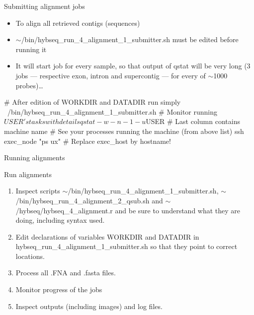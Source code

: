 \documentclass[compress, ucs, xelatex, 11pt, xcolor=x11names, aspectratio=1609,
	hyperref={
		bookmarks=true,
		unicode=true,
		colorlinks=true,
		pdftitle={HybSeq course},
		plainpages=false,
		pdfauthor={Vojtech Zeisek},
		pdfsubject={Practical processing of HybSeq target enrichment sequencing data on computing grids like MetaCentrum},
		pdfcreator={XeLaTeX},
		pdfkeywords={BASH, command line, GNU, HybSeq, Linux, MetaCentrum, sequencing shell, target enrichment},
		linkcolor=Cyan2, %
		anchorcolor=Firebrick2, %
		citecolor=Firebrick2, %
		filecolor=Firebrick2, %
		menucolor=Firebrick2, %
		urlcolor=Chartreuse2, %
		pdftex},
	url={hyphens, lowtilde} %
	]{beamer}
\renewcommand{\texttt}[1]{\colorbox{Snow4}{{\ttfamily #1}}}
\renewcommand{\alert}[1]{\textcolor{OrangeRed2}{#1}}
\begin{document}
\begin{frame}[fragile]{Submitting alignment jobs}
	\begin{itemize}
		\item To align all retrieved contigs (sequences)
		\item \alert{\texttt{$\sim$/bin/hybseq\_run\_4\_alignment\_1\_submitter.sh} must be edited before running it}
		\item It will start job for every sample, so that output of \texttt{qstat} will be very long (3 jobs --- respective exon, intron and supercontig --- for every of $\sim$1000 probes)\ldots
	\end{itemize}
	\begin{bashcode}
    # After edition of WORKDIR and DATADIR run simply
    ~/bin/hybseq_run_4_alignment_1_submitter.sh
    # Monitor running $USER's tasks with details
    qstat -w -n -1 -u $USER # Last column contains machine name
    # See your processes running the machine (from above list)
    ssh exec_node "ps ux" # Replace exec_host by hostname!
	\end{bashcode}
\end{frame}

\begin{frame}{Running alignments}
	\begin{exampleblock}{Run alignments}
		\begin{enumerate}
			\item Inspect scripts \texttt{$\sim$/bin/hybseq\_run\_4\_alignment\_1\_submitter.sh}, \texttt{$\sim$/bin/hybseq\_run\_4\_alignment\_2\_qsub.sh} and \texttt{$\sim$/hybseq/hybseq\_4\_alignment.r} and be sure to understand what they are doing, including syntax used.
			\item Edit declarations of variables \texttt{WORKDIR} and \texttt{DATADIR} in \texttt{hybseq\_run\_4\_alignment\_1\_submitter.sh} so that they point to correct locations.
			\item Process all \texttt{*.FNA} and \texttt{*.fasta} files.
			\item Monitor progress of the jobs
			\item Inspect outputs (including images) and log files.
		\end{enumerate}
	\end{exampleblock}
\end{frame}
\end{document}
